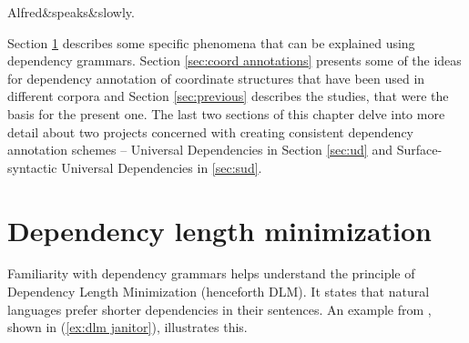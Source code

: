 \begin{exe}
    \ex
    \label{ex:tesniere today}
    \begin{dependency}[theme = simple, baseline=-\the\dimexpr\fontdimen22\textfont2\relax]
    \begin{deptext}
        Alfred\&speaks\&slowly.\\
    \end{deptext}
    \end{dependency}
\end{exe} 

Section \ref{sec:dlm} describes some specific phenomena that can be explained using dependency grammars. Section \ref{sec:coord annotations} presents some of the ideas for dependency annotation of coordinate structures that have been used in different corpora and Section \ref{sec:previous} describes the studies, that were the basis for the present one. The last two sections of this chapter delve into more detail about two projects concerned with creating consistent dependency annotation schemes -- Universal Dependencies in Section \ref{sec:ud} and Surface-syntactic Universal Dependencies in \ref{sec:sud}. 

\section{Dependency length minimization}\label{sec:dlm}
Familiarity with dependency grammars helps understand the principle of Dependency Length Minimization (henceforth DLM). It states that natural languages prefer shorter dependencies in their sentences. An example from \cite{hp83}, shown in (\ref{ex:dlm janitor}), illustrates this.


